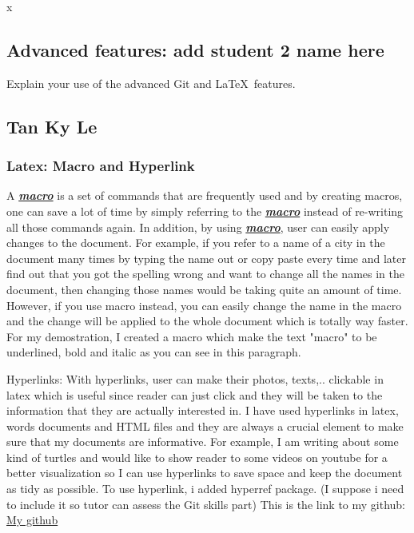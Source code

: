 \documentclass[a4paper, 11pt]{report}
\begin{document}
x


\subsection{Advanced features: add student 2 name here}

Explain your use of the advanced Git and \LaTeX\ features. 

\subsection{Tan Ky Le}

\subsubsection{ Latex: Macro and Hyperlink}
\newcommand{\BoldandItalic}[0]{\textbf{\textit{ \underline{macro}}}}

A\BoldandItalic{} is a set of commands that are frequently used and by creating macros, one can save a lot of time by simply referring to the\BoldandItalic{} instead of re-writing all those commands again. In addition, by using\BoldandItalic{}, user can easily apply changes to the document. For example, if you refer to a name of a city in the document many times by typing the name out or copy paste every time and later find out that you got the spelling wrong and want to change all the names in the document, then changing those names would be taking quite an amount of time. However, if you use macro instead, you can easily change the name in the macro and the change will be applied to the whole document which is totally way faster. For my demostration, I created a macro which make the text "macro" to be underlined, bold and italic  as you can see in this paragraph.

Hyperlinks: With hyperlinks, user can make their photos, texts,.. clickable in latex which is useful since reader can just click and they will be taken to the information that they are actually interested in. I have used hyperlinks in latex, words documents and HTML files and they are always a crucial element to make sure that my documents are informative. For example, I am writing about some kind of turtles and would like to show reader to some videos on youtube for a better visualization so I can use hyperlinks to save space and keep the document as tidy as possible. To use hyperlink, i added hyperref package.
(I suppose i need to include it so tutor can assess the Git skills part) This is the link to my github: \href{https://github.com/Kyle240/testing.git}{My github}
\end{document}
